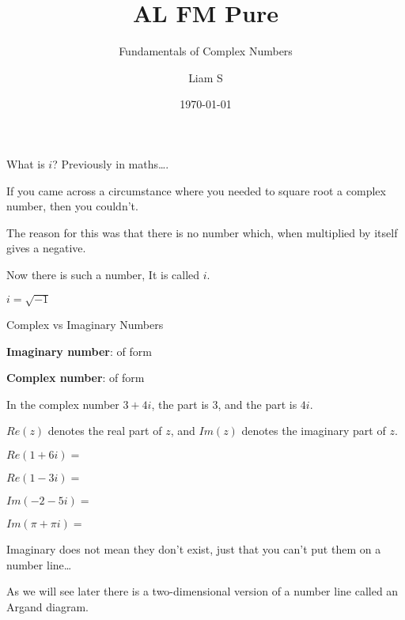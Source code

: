 \documentclass[8pt]{beamer}
\title[Pure]{{\color{aa}\Huge\adfbullet{9}}AL FM Pure}
\subtitle{Fundamentals of Complex Numbers}
\author{Liam S}
\date{\today}
\begin{document}
	
	\setlength{\abovedisplayskip}{0pt}
	\setlength{\belowdisplayskip}{0pt}
	\setlength{\abovedisplayshortskip}{0pt}
	\setlength{\belowdisplayshortskip}{0pt}
	
	\frame{\titlepage}
	
	\begin{frame}{What is $i$?}
	    Previously in maths….
    
        If you came across a circumstance where you needed to square root a complex number, then you couldn’t.
        
        The reason for this was that there is no number which, when multiplied by itself gives a negative.
        
        Now there is such a number, It is called $i$.
        
        \begin{definition}
            $i=\sqrt{-1}$
        \end{definition}
	\end{frame}
	
	\begin{frame}{Complex vs Imaginary Numbers}
	    
	    \textbf{Imaginary number}: of form 
	    
	    \textbf{Complex number}: of form 
	    
	    In the complex number $3+4i$, the  part is $3$, and the  part is $4i$.
	    
	    \begin{definition}
	        $Re(z)$ denotes the real part of $z$, and $Im(z)$ denotes the imaginary part of $z$.
	    \end{definition}

	    $Re(1+6i)=$ 

	    $Re(1-3i)=$ 

	    $Im(-2-5i)=$ 

	    $Im(\pi + \pi i)=$ \sol{$\pi$}
	    
	    Imaginary does not mean they don’t exist, just that you can’t put them on a number line…

        As we will see later there is a two-dimensional version of a number line called an Argand diagram.
\end{frame}
	
\end{document}
